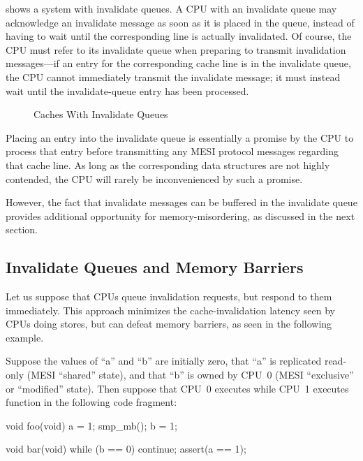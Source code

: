 shows a system with invalidate queues.
A CPU with an invalidate queue may acknowledge an invalidate message
as soon as it is placed in the queue, instead of having to wait until
the corresponding line is actually invalidated.
Of course, the CPU must refer to its invalidate queue when preparing
to transmit invalidation messages---if an entry for the corresponding
cache line is in the invalidate queue, the CPU cannot immediately
transmit the invalidate message; it must instead wait until the
invalidate-queue entry has been processed.

\begin{figure}[htb]
\centering
{}
\caption{Caches With Invalidate Queues}
\label{fig:app:whymb:Caches With Invalidate Queues}
\end{figure}

Placing an entry into the invalidate queue is essentially a promise
by the CPU to process that entry before transmitting any MESI protocol
messages regarding that cache line.
As long as the corresponding data structures are not highly contended,
the CPU will rarely be inconvenienced by such a promise.

However, the fact that invalidate messages can be buffered in the
invalidate queue provides additional opportunity for memory-misordering,
as discussed in the next section.

\subsection{Invalidate Queues and Memory Barriers}
\label{sec:app:whymb:Invalidate Queues and Memory Barriers}

Let us suppose that CPUs queue invalidation requests, but respond to
them immediately.
This approach minimizes the cache-invalidation latency seen by CPUs
doing stores, but can defeat memory barriers, as seen in the following
example.

Suppose the values of ``a'' and ``b'' are initially zero,
that ``a'' is replicated read-only (MESI ``shared'' state),
and that ``b''
is owned by CPU~0 (MESI ``exclusive'' or ``modified'' state).
Then suppose that CPU~0 executes  while CPU~1 executes
function  in the following code fragment:

\begin{fcvlabel}
\begin{VerbatimN}[fontsize=\footnotesize,samepage=true,commandchars=\\\[\]]
void foo(void)
{
	a = 1;
	smp_mb();	\lnlbl[mb]
	b = 1;
}

void bar(void)
{
	while (b == 0) continue;
	assert(a == 1);
}
\end{VerbatimN}
\end{fcvlabel}

